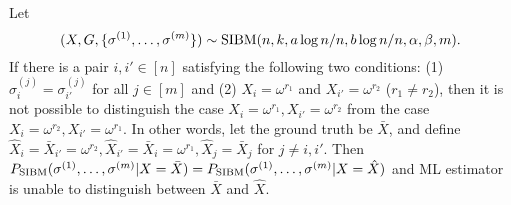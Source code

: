 \documentclass{article}
\begin{document}
\begin{lemma} \label{lm:qq}
	Let 
	$$
	(X,G,\{\sigma^{(1)},\dots,\sigma^{(m)}\})\sim \operatorname{SIBM}(n,k,a\log n/n, b\log n/n,\alpha,\beta, m) .
	$$
	If there is a pair $i, i'\in[n]$ satisfying the following two conditions: (1) $\sigma_{i}^{(j)}=\sigma_{i'}^{(j)}$ for all $j\in[m]$ and (2) $X_i = \omega^{r_1}$ and $X_{i'} = \omega^{r_2}$ ($r_1 \neq r_2$), then it is not possible to distinguish
	the case $X_i = \omega^{r_1}, X_{i'} = \omega^{r_2}$
	from the case $X_i = \omega^{r_2}, X_{i'} = \omega^{r_1}$.
	In other words, let the ground truth be $\bar{X}$, and define $\hat{X}_{i} = \bar{X}_{i'}= \omega^{r_2}, \hat{X}_{i'} = \bar{X}_{i} = \omega^{r_1}, \hat{X}_j = \bar{X}_j$ for $j\neq i,i'$. Then	$P_{\operatorname{SIBM}}(\sigma^{(1)}, \dots, \sigma^{(m)}|X=\bar{X}) = P_{\operatorname{SIBM}}(\sigma^{(1)}, \dots, \sigma^{(m)}|X=\hat{X})$ and ML estimator is unable to distinguish between $\bar{X}$
	and $\hat{X}$.
\end{lemma}
\end{document}
